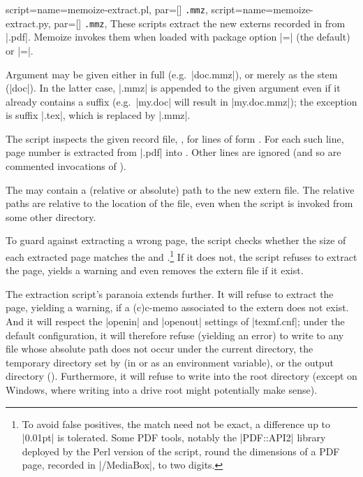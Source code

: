\documentclass[a4paper,11pt]{article}
\begin{document}
\begin{doc}{
    script={name=memoize-extract.pl, par=[] \texttt{.mmz}},
    script={name=memoize-extract.py, par=[] \texttt{.mmz}},
  }
  These scripts extract the new externs recorded in \dmmz from
  |.pdf|.  Memoize invokes them when loaded with package option
  |=| (the default) or
  |=|.

  Argument \dmmz may be given either in full (e.g.\ |doc.mmz|), or
  merely as the stem (|doc|).  In the latter case, |.mmz| is appended to the
  given argument even if it already contains a suffix (e.g.\ |my.doc| will
  result in |my.doc.mmz|); the exception is suffix |.tex|, which is replaced by
  |.mmz|.
  
  The script inspects the given record file, \dmmz, for lines of
  form .  For each such line, page number
   is extracted from |.pdf| into
  . Other lines are ignored (and so are commented
  invocations of ).

  The  may contain a (relative or absolute) path to the
  new extern file.  The relative paths are relative to the location of the
  \dmmz file, even when the script is invoked from some other directory.

  To guard against extracting a wrong page, the script checks whether the size
  of each extracted page matches the  and .\footnote{\label{fn:tolerance}To avoid false positives, the match
    need not be exact, a difference up to |0.01pt| is tolerated.  Some PDF
    tools, notably the |PDF::API2| library deployed by the Perl version of the
    script, round the dimensions of a PDF page, recorded in |/MediaBox|, to two
    digits.}  If it does not, the script refuses to extract the page, yields a
  warning and even removes the extern file if it exist.

  The extraction script's paranoia extends further.  It will refuse to extract
  the page, yielding a warning, if a (c)c-memo associated to the extern does
  not exist.  And it will respect the |openin| and |openout| settings of
  |texmf.cnf|; under the default configuration, it will therefore refuse
  (yielding an error) to write to any file whose absolute path does not occur
  under the current directory, the temporary directory set by
   (in  or as an environment variable),
  or the output directory ().  Furthermore, it
  will refuse to write into the root directory (except on Windows, where
  writing into a drive root might potentially make sense).


\end{doc}
\end{document}

